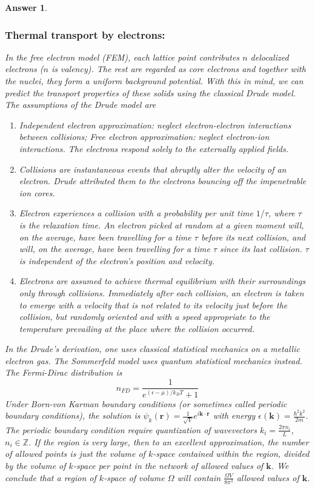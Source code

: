 \documentclass[a4paper]{article}
\newtheorem{ans}{Answer}[subsection]
\theoremstyle{new}
\begin{document}
\begin{ans}
\subsubsection*{Thermal transport by electrons:}
In the free electron model (FEM), each lattice point contributes $n$ delocalized electrons ($n$ is valency). The rest are regarded as core electrons and together with the nuclei, they form a uniform background potential. With this in mind, we can predict the transport properties of these solids using the classical Drude model. The assumptions of the Drude model are
\begin{enumerate}
    \item Independent electron approximation: neglect electron-electron interactions between collisions; Free electron approximation: neglect electron-ion interactions. The electrons respond solely to the externally applied fields.
    \item Collisions are instantaneous events that abruptly alter the velocity of an electron. Drude attributed them to the electrons bouncing off the impenetrable ion cores.
    \item Electron experiences a collision with a probability per unit time $1/\tau$, where $\tau$ is the relaxation time. An electron picked at random at a given moment will, on the average, have been travelling for a time $\tau$ before its next collision, and will, on the average, have been travelling for a time $\tau$ since its last collision. $\tau$ is independent of the electron's position and velocity.
    \item Electrons are assumed to achieve thermal equilibrium with their surroundings only through collisions. Immediately after each collision, an electron is taken to emerge with a velocity that is not related to its velocity just before the collision, but randomly oriented and with a speed appropriate to the temperature prevailing at the place where the collision occurred.
\end{enumerate}
In the Drude's derivation, one uses classical statistical mechanics on a metallic electron gas. The Sommerfeld model uses quantum statistical mechanics instead. The Fermi-Dirac distribution is
$$n_{FD}=\frac{1}{e^{(\epsilon-\mu)/k_BT}+1}$$
Under Born-von Karman boundary conditions (or sometimes called periodic boundary conditions), the solution is $\psi_k(\mathbf{r})=\frac{1}{\sqrt{V}}e^{i\mathbf{k}\cdot\mathbf{r}}$ with energy $\epsilon(\mathbf{k})=\frac{\hbar^2k^2}{2m}$. The periodic boundary condition require quantization of wavevectors $k_i=\frac{2\pi n_i}{L}$, $n_i\in\mathbb{Z}$. If the region is very large, then to an excellent approximation, the number of allowed points is just the volume of $k$-space contained within the region, divided by the volume of $k$-space per point in the network of allowed values of $\mathbf{k}$. We conclude that a region of $k$-space of volume $\Omega$ will contain $\frac{\Omega V}{8\pi^3}$ allowed values of $\mathbf{k}$.\\[5pt]

\end{ans}
\end{document}
